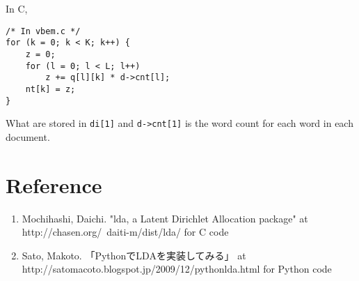 \documentclass[a4paper,10.5pt,dvipdfmx]{jarticle}  %
\begin{document}
In C,
\begin{lstlisting}[style=C]
/* In vbem.c */
for (k = 0; k < K; k++) {
	z = 0;
	for (l = 0; l < L; l++)
		z += q[l][k] * d->cnt[l];
	nt[k] = z;
}
\end{lstlisting}

What are stored in \texttt{di[1]} and \texttt{d->cnt[1]} is the word count for each word in each document.

\section*{Reference}
\begin{enumerate}
	\item Mochihashi, Daichi. "lda, a Latent Dirichlet Allocation package" at http://chasen.org/~daiti-m/dist/lda/ for C code
	\item Sato, Makoto. 「PythonでLDAを実装してみる」 at http://satomacoto.blogspot.jp/2009/12/pythonlda.html for Python code
\end{enumerate}
\end{document}
